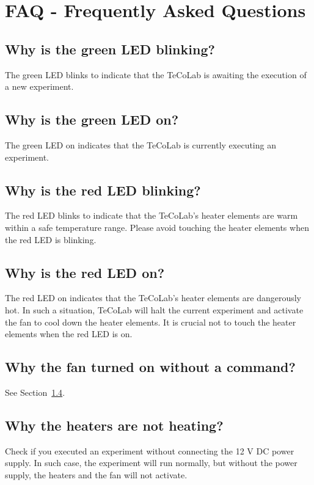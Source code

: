 \documentclass[12pt]{report}
\begin{document}
\chapter{FAQ - Frequently Asked Questions}\label{chap:FAQ}

\section{Why is the green LED blinking?}

The green LED blinks to indicate that the TeCoLab is awaiting the execution of a new experiment.

\section{Why is the green LED on?}

The green LED on indicates that the TeCoLab is currently executing an experiment.

\section{Why is the red LED blinking?}

The red LED blinks to indicate that the TeCoLab's heater elements are warm within a safe temperature range. Please avoid touching the heater elements when the red LED is blinking.

\section{Why is the red LED on?}\label{sec:RedLEDOn}

The red LED on indicates that the TeCoLab's heater elements are dangerously hot. In such a situation, TeCoLab will halt the current experiment and activate the fan to cool down the heater elements. It is crucial not to touch the heater elements when the red LED is on.

\section{Why the fan turned on without a command?}

See Section~\ref{sec:RedLEDOn}.

\section{Why the heaters are not heating?}

Check if you executed an experiment without connecting the 12 V DC power supply. In such case, the experiment will run normally, but without the power supply, the heaters and the fan will not activate.
\end{document}
